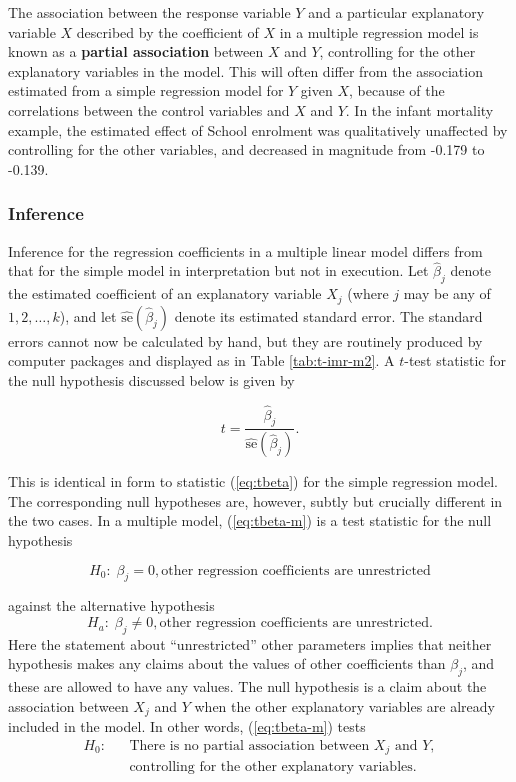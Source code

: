 \documentclass[11pt,a4paper,openany]{book}
\begin{document}
The association between the response variable \(Y\) and a particular
explanatory variable \(X\) described by the coefficient of \(X\) in a
multiple regression model is known as a \textbf{partial association}
between \(X\) and \(Y\), controlling for the other explanatory variables
in the model. This will often differ from the association estimated from
a simple regression model for \(Y\) given \(X\), because of the
correlations between the control variables and \(X\) and \(Y\). In the
infant mortality example, the estimated effect of School enrolment was
qualitatively unaffected by controlling for the other variables, and
decreased in magnitude from -0.179 to -0.139.

\subsubsection*{Inference}\label{inference}

Inference for the regression coefficients in a multiple linear model
differs from that for the simple model in interpretation but not in
execution. Let \(\hat{\beta}_{j}\) denote the estimated coefficient of
an explanatory variable \(X_{j}\) (where \(j\) may be any of
\(1,2,\dots,k\)), and let \(\hat{\text{se}}(\hat{\beta}_{j})\) denote
its estimated standard error. The standard errors cannot now be
calculated by hand, but they are routinely produced by computer packages
and displayed as in Table \ref{tab:t-imr-m2}. A \(t\)-test statistic for
the null hypothesis discussed below is given by

\begin{equation}t=\frac{\hat{\beta}_{j}}{\hat{\text{se}}(\hat{\beta}_{j})}.
\label{eq:tbeta-m}\end{equation}

This is identical in form to statistic (\ref{eq:tbeta}) for the simple
regression model. The corresponding null hypotheses are, however, subtly
but crucially different in the two cases. In a multiple model,
(\ref{eq:tbeta-m}) is a test statistic for the null hypothesis

\begin{equation}H_{0}:\; \beta_{j}=0, \text{other regression coefficients
are unrestricted}
\label{eq:H0beta-m}\end{equation}

against the alternative hypothesis
\[H_{a}:\; \beta_{j}\ne0, \text{other regression coefficients
are unrestricted}.\] Here the statement about ``unrestricted'' other
parameters implies that neither hypothesis makes any claims about the
values of other coefficients than \(\beta_{j}\), and these are allowed
to have any values. The null hypothesis is a claim about the association
between \(X_{j}\) and \(Y\) when the other explanatory variables are
already included in the model. In other words, (\ref{eq:tbeta-m}) tests
\[\begin{aligned}
H_{0}:& & \text{There is no partial association between }
X_{j} \text{ and } Y,\\
&&  \text{controlling for the other explanatory
variables.}\end{aligned}\]
\end{document}
